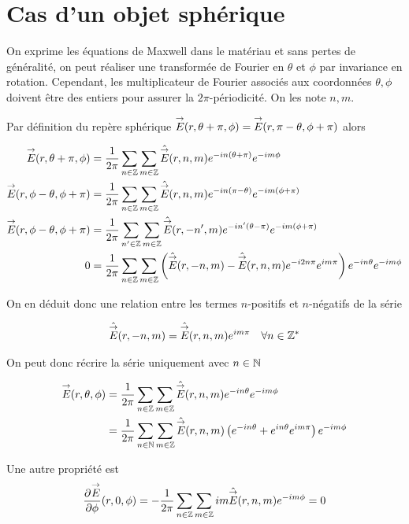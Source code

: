 \section{Cas d'un objet sphérique}

    On exprime les équations de Maxwell dans le matériau et sans pertes de généralité, on peut réaliser une transformée de Fourier en \(\theta\) et \(\phi\) par invariance en rotation.
    Cependant, les multiplicateur de Fourier associés aux coordonnées \(\theta,\phi\) doivent être des entiers pour assurer la \(2\pi\)-périodicité. On les note \(n,m\).

    Par définition du repère sphérique \({\overset{\rightarrow}{E}}(r,\theta+\pi,\phi) =  {\overset{\rightarrow}{E}}(r,\pi-\theta,\phi + \pi)\) alors

    \begin{align}
        {\overset{\rightarrow}{E}}(r,\theta+\pi,\phi) &= \dfrac{1}{2\pi}\sum_{n\in\mathbb Z}\sum_{m\in\mathbb Z} \hat{{\overset{\rightarrow}{E}}}(r,n,m) e^{-in(\theta+\pi)} e^{-im\phi}
        \\
        {\overset{\rightarrow}{E}}(r,\phi-\theta,\phi+\pi)&=\dfrac{1}{2\pi}\sum_{n\in\mathbb Z}\sum_{m\in\mathbb Z} \hat{{\overset{\rightarrow}{E}}}(r,n,m) e^{-in( \pi - \theta)} e^{-im(\phi+ \pi)}
        \\
        {\overset{\rightarrow}{E}}(r,\phi-\theta,\phi+\pi)&=\dfrac{1}{2\pi}\sum_{n'\in\mathbb Z}\sum_{m\in\mathbb Z} \hat{{\overset{\rightarrow}{E}}}(r,-n',m) e^{-in'(\theta-\pi)} e^{-im(\phi+ \pi)}
        \\
        0&=\dfrac{1}{2\pi}\sum_{n\in\mathbb Z}\sum_{m\in\mathbb Z} \left( \hat{{\overset{\rightarrow}{E}}}(r,-n,m) - \hat{{\overset{\rightarrow}{E}}}(r,n,m)e^{-i2n\pi}e^{im\pi}\right)e^{-in\theta}e^{-im\phi}
    \end{align}

    On en déduit donc une relation entre les termes \(n\)-positifs et \(n\)-négatifs de la série

    \begin{align}
        \hat{{\overset{\rightarrow}{E}}}(r,-n,m) = \hat{{\overset{\rightarrow}{E}}}(r,n,m)e^{im\pi} && \forall n \in\mathbb Z^*
    \end{align}

    On peut donc récrire la série uniquement avec \(n\in\mathbb N\)

    \begin{align}
        {\overset{\rightarrow}{E}}(r,\theta,\phi) &= \dfrac{1}{2\pi}\sum_{n\in\mathbb Z}\sum_{m\in\mathbb Z} \hat{{\overset{\rightarrow}{E}}}(r,n,m) e^{-in\theta} e^{-im\phi}
        \\
        &= \dfrac{1}{2\pi}\sum_{n\in\mathbb N}\sum_{m\in\mathbb Z} \hat{{\overset{\rightarrow}{E}}}(r,n,m) \left( e^{-in\theta} + e^{in\theta}e^{im\pi}\right)e^{-im\phi}
    \end{align}

    Une autre propriété est
    \begin{equation}
        \displaystyle\dfrac{\partial^{{}} {\overset{\rightarrow}{E}}}{{\partial \phi}^{{}}}(r,0,\phi) = -\dfrac{1}{2\pi}\sum_{n\in\mathbb Z}\sum_{m\in\mathbb Z} im\hat{{\overset{\rightarrow}{E}}}(r,n,m) e^{-im\phi}= 0
    \end{equation}

